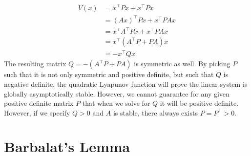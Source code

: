 \begin{equation*}
  \begin{split}
    \dot{V}(x)&=\dot{x}^{\top}Px+x^{\top}P\dot{x} \\
    &=(Ax)^{\top}Px+x^{\top}PAx \\
    &=x^{\top}A^{\top}Px+x^{\top}PAx \\
    &=x^{\top}(A^{\top}P+PA)x \\
    &=-x^{\top}Qx
  \end{split}
\end{equation*}
The resulting matrix $Q=-(A^{\top}P+PA)$ is symmetric as well.
By picking $P$ such that it is not only symmetric and positive definite, but such that $Q$ is negative definite, the quadratic Lyapunov function will prove the linear system is globally asymptotically stable.
However, we cannot guarantee for any given positive definite matrix $P$ that when we solve for $Q$ it will be positive definite.
However, if we specify $Q>0$ and $A$ is stable, there always exists $P=P^{\top}>0$.


\section{Barbalat's Lemma}


